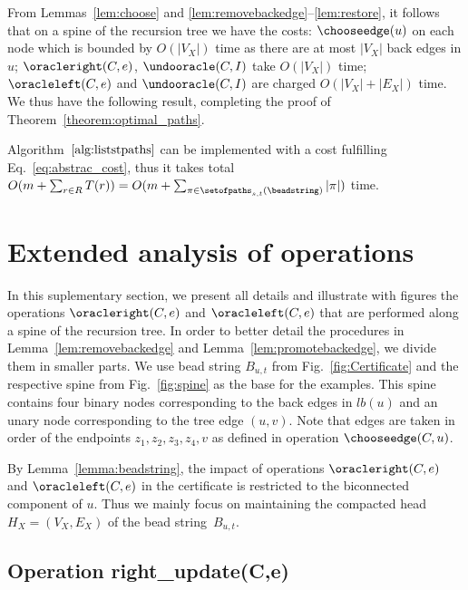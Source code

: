 From Lemmas~\ref{lem:choose} and
\ref{lem:removebackedge}--\ref{lem:restore}, it follows that on a
spine of the recursion tree we have the costs:
$\chooseedge(u)$ on each node which is bounded by $O(|V_X|)$ time as there
are at most $|V_X|$ back edges in $u$; $\oracleright(C,e)$,
$\undooracle(C,I)$ take $O(|V_X|)$ time; $\oracleleft(C,e)$ and
$\undooracle(C,I)$ are charged $O(|V_X|+|E_X|)$ time.  We thus have the following
result,  completing the proof of Theorem~\ref{theorem:optimal_paths}.

\begin{lemma}
	\label{lem:algo_cost}
	Algorithm~$\ref{alg:liststpaths}$ can be implemented with a
        cost fulfilling Eq.~\eqref{eq:abstrac_cost}, thus it takes
        total \mbox{$O(m+\sum_{r \in R} T(r)) = O(m+\sum_{\pi \in
	\setofpaths_{s,t}(\beadstring)}{|\pi|})$} time.
\end{lemma}

\section{Extended analysis of operations}
\label{app:extend-analys-oper}

In this suplementary section, we present all details and illustrate
with figures the operations $\oracleright(C,e)$ and $\oracleleft(C,e)$
that are performed along a spine of the recursion tree. In order to
better detail the procedures in Lemma~\ref{lem:removebackedge} and
Lemma~\ref{lem:promotebackedge}, we divide them in smaller parts.  We
use bead string $B_{u,t}$ from Fig.~\ref{fig:Certificate} and the
respective spine from Fig.~\ref{fig:spine} as the base for the
examples. This spine contains four binary nodes corresponding to the
back edges in $lb(u)$ and an unary node corresponding to the tree edge
$(u,v)$. Note that edges are taken in order of the endpoints
$z_1,z_2,z_3,z_4,v$ as defined in operation $\chooseedge(C,u)$.

By Lemma~\ref{lemma:beadstring}, the impact of operations
$\oracleright(C,e)$ and $\oracleleft(C,e)$ in the certificate is
restricted to the biconnected component of $u$. Thus we mainly focus
on maintaining the compacted head $H_X = (V_X,E_X)$ of the bead
string~$B_{u,t}$.

\subsection{Operation right\_update(C,e)} 


